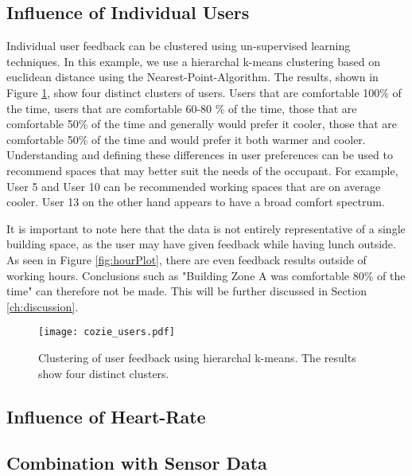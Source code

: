 \subsection{Influence of Individual Users}

Individual user feedback can be clustered using un-supervised learning techniques. In this example, we use a hierarchal k-means clustering based on euclidean distance using the Nearest-Point-Algorithm. The results, shown in Figure \ref{fig:userPlot}, show four distinct clusters of users. Users that are comfortable 100\% of the time, users that are comfortable 60-80 \% of the time, those that are comfortable 50\% of the time and generally would prefer it cooler, those that are comfortable 50\% of the time and would prefer it both warmer and cooler. Understanding and defining these differences in user preferences can be used to recommend spaces that may better suit the needs of the occupant. For example, User 5 and User 10 can be recommended working spaces that are on average cooler. User 13 on the other hand appears to have a broad comfort spectrum. 

It is important to note here that the data is not entirely representative of a single building space, as the user may have given feedback while having lunch outside. As seen in Figure \ref{fig:hourPlot}, there are even feedback results outside of working hours. Conclusions such as "Building Zone A was comfortable 80\% of the time" can therefore not be made. This will be further discussed in Section \ref{ch:discussion}.


\begin{figure}
\begin{center}
\texttt{[image: cozie\_users.pdf]}
\caption{Clustering of user feedback using hierarchal k-means. The results show four distinct clusters.}
\label{fig:userPlot}
\end{center}
\end{figure}

\subsection{Influence of Heart-Rate}

\subsection{Combination with Sensor Data}